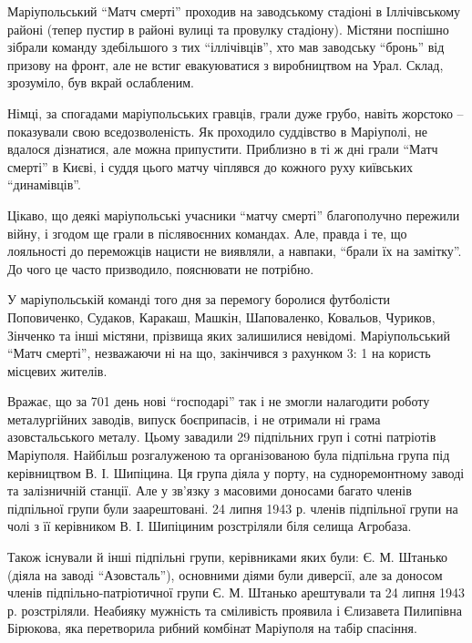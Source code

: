 Маріупольський \enquote{Матч смерті} проходив на заводському стадіоні в Іллічівському
районі (тепер пустир в районі вулиці та провулку стадіону). Містяни поспішно
зібрали команду здебільшого з тих \enquote{іллічівців}, хто мав заводську \enquote{бронь} від
призову на фронт, але не встиг евакуюватися з виробництвом на Урал. Склад,
зрозуміло, був вкрай ослабленим.

Німці, за спогадами маріупольських гравців, грали дуже грубо, навіть жорстоко –
показували свою вседозволеність. Як проходило суддівство в Маріуполі, не
вдалося дізнатися, але можна припустити. Приблизно в ті ж дні грали \enquote{Матч
смерті} в Києві, і суддя цього матчу чіплявся до кожного руху київських
\enquote{динамівців}.


Цікаво, що деякі маріупольські учасники \enquote{матчу смерті} благополучно пережили
війну, і згодом ще грали в післявоєнних командах. Але, правда і те, що
лояльності до переможців нацисти не виявляли, а навпаки, \enquote{брали їх на замітку}.
До чого це часто призводило, пояснювати не потрібно.

У маріупольській команді того дня за перемогу боролися футболісти Поповиченко,
Судаков, Каракаш, Машкін, Шаповаленко, Ковальов, Чуриков, Зінченко та інші
містяни, прізвища яких залишилися невідомі. Маріупольський \enquote{Матч смерті},
незважаючи ні на що, закінчився з рахунком 3: 1 на користь місцевих жителів.

Вражає, що за 701 день нові \enquote{господарі} так і не змогли налагодити роботу
металургійних заводів, випуск боєприпасів, і не отримали ні грама
азовстальського металу. Цьому завадили 29 підпільних груп і сотні патріотів
Маріуполя. Найбільш розгалуженою та організованою була підпільна група під
керівництвом В. І. Шипіцина. Ця група діяла у порту, на судноремонтному заводі
та залізничній станції. Але у зв'язку з масовими доносами багато членів
підпільної групи були заарештовані. 24 липня 1943 р. членів підпільної групи на
чолі з її керівником В. І. Шипіциним розстріляли біля селища Агробаза.

Також існували й інші підпільні групи, керівниками яких були: Є. М. Штанько
(діяла на заводі \enquote{Азовсталь}), основними діями були диверсії, але за доносом
членів підпільно-патріотичної групи Є. М. Штанько арештували та 24 липня 1943 р.
розстріляли. Неабияку мужність та сміливість проявила і Єлизавета Пилипівна
Бірюкова, яка перетворила рибний комбінат Маріуполя на табір спасіння.

